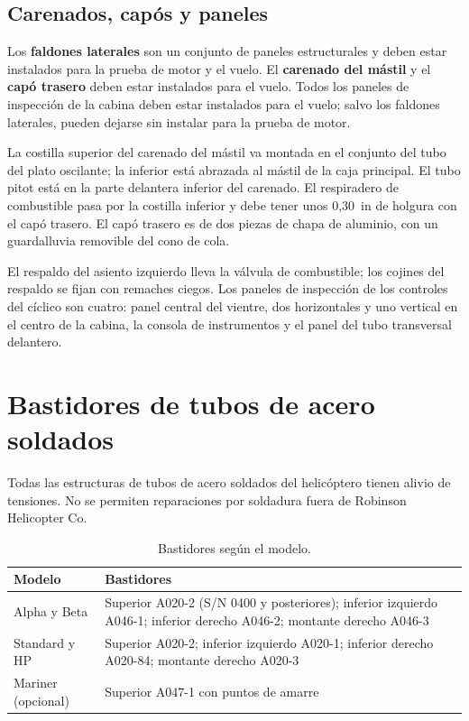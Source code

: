 \subsection{Carenados, capós y paneles}

\begin{precaucion}
Los \textbf{faldones laterales} son un conjunto de paneles estructurales y deben estar instalados para la prueba de motor y el vuelo. El \textbf{carenado del mástil} y el \textbf{capó trasero} deben estar instalados para el vuelo. Todos los paneles de inspección de la cabina deben estar instalados para el vuelo; salvo los faldones laterales, pueden dejarse sin instalar para la prueba de motor.
\end{precaucion}

La costilla superior del carenado del mástil va montada en el conjunto del tubo del plato oscilante; la inferior está abrazada al mástil de la caja principal. El tubo pitot está en la parte delantera inferior del carenado. El respiradero de combustible pasa por la costilla inferior y debe tener unos 0,30~in de holgura con el capó trasero. El capó trasero es de dos piezas de chapa de aluminio, con un guardalluvia removible del cono de cola.

El respaldo del asiento izquierdo lleva la válvula de combustible; los cojines del respaldo se fijan con remaches ciegos. Los paneles de inspección de los controles del cíclico son cuatro: panel central del vientre, dos horizontales y uno vertical en el centro de la cabina, la consola de instrumentos y el panel del tubo transversal delantero.

\section{Bastidores de tubos de acero soldados}

\begin{advertencia}
Todas las estructuras de tubos de acero soldados del helicóptero tienen alivio de tensiones. No se permiten reparaciones por soldadura fuera de Robinson Helicopter Co.
\end{advertencia}

\begin{table}[htbp]
\centering\small
\caption{Bastidores según el modelo.}
\begin{tabularx}{\linewidth}{@{}lY@{}}
\toprule
Modelo & Bastidores \\
\midrule
Alpha y Beta & Superior A020-2 (S/N 0400 y posteriores); inferior izquierdo A046-1; inferior derecho A046-2; montante derecho A046-3 \\
Standard y HP & Superior A020-2; inferior izquierdo A020-1; inferior derecho A020-84; montante derecho A020-3 \\
Mariner (opcional) & Superior A047-1 con puntos de amarre \\
\bottomrule
\end{tabularx}
\end{table}

